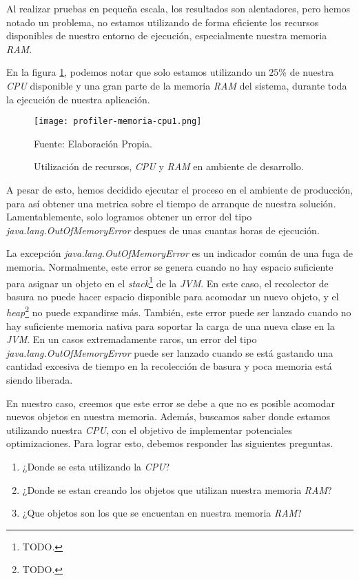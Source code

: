 Al realizar pruebas en pequeña escala, los resultados son alentadores, pero hemos notado un problema, no estamos utilizando de forma eficiente los recursos disponibles de nuestro entorno de ejecución, especialmente nuestra memoria \textit{RAM}.

En la figura \ref{fig:i2-prof-htop}, podemos notar que solo estamos utilizando un $25\%$ de nuestra \textit{CPU} disponible y una gran parte de la memoria \textit{RAM} del sistema, durante toda la ejecución de nuestra aplicación.

\begin{figure}[ht]
    \centering
    \texttt{[image: profiler-memoria-cpu1.png]}
    \caption{Utilización de recursos, \textit{CPU} y \textit{RAM} en ambiente de desarrollo.}Fuente: Elaboración Propia.
    \label{fig:i2-prof-htop}
\end{figure}

A pesar de esto, hemos decidido ejecutar el proceso en el ambiente de producción, para así obtener una metrica sobre el tiempo de arranque de nuestra solución. Lamentablemente, solo logramos obtener un error del tipo \textit{java.lang.OutOfMemoryError} despues de unas cuantas horas de ejecución.

La excepción \textit{java.lang.OutOfMemoryError} es un indicador común de una fuga de memoria. Normalmente, este error se genera cuando no hay espacio suficiente para asignar un objeto en el \textit{stack}\footnote{TODO.} de la \textit{JVM}. En este caso, el recolector de basura no puede hacer espacio disponible para acomodar un nuevo objeto, y el \textit{heap}\footnote{TODO.} no puede expandirse más. También, este error puede ser lanzado cuando no hay suficiente memoria nativa para soportar la carga de una nueva clase en la \textit{JVM}. En un casos extremadamente raros, un error del tipo \textit{java.lang.OutOfMemoryError} puede ser lanzado cuando se está gastando una cantidad excesiva de tiempo en la recolección de basura y poca memoria está siendo liberada.

En nuestro caso, creemos que este error se debe a que no es posible acomodar nuevos objetos en nuestra memoria. Además, buscamos saber donde estamos utilizando nuestra \textit{CPU}, con el objetivo de implementar potenciales optimizaciones. Para lograr esto, debemos responder las siguientes preguntas.

\begin{enumerate}
    \item ¿Donde se esta utilizando la \textit{CPU}?
    \item ¿Donde se estan creando los objetos que utilizan nuestra memoria \textit{RAM}?
    \item ¿Que objetos son los que se encuentan en nuestra memoria \textit{RAM}?
\end{enumerate}

